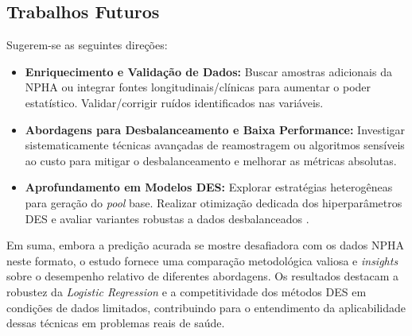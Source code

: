 \documentclass[12pt]{article}
\begin{document}
\subsection*{Trabalhos Futuros}
Sugerem-se as seguintes direções:
\begin{itemize}
    \item \textbf{Enriquecimento e Validação de Dados:} Buscar amostras adicionais da NPHA ou integrar fontes longitudinais/clínicas para aumentar o poder estatístico. Validar/corrigir ruídos identificados nas variáveis.
    \item \textbf{Abordagens para Desbalanceamento e Baixa Performance:} Investigar sistematicamente técnicas avançadas de reamostragem ou algoritmos sensíveis ao custo para mitigar o desbalanceamento e melhorar as métricas absolutas.
    \item \textbf{Aprofundamento em Modelos DES:} Explorar estratégias heterogêneas para geração do \textit{pool} base. Realizar otimização dedicada dos hiperparâmetros DES e avaliar variantes robustas a dados desbalanceados \cite{ICPRAI2018SI, Wu2021}. 
\end{itemize}

Em suma, embora a predição acurada se mostre desafiadora com os dados NPHA neste formato, o estudo fornece uma comparação metodológica valiosa e \textit{insights} sobre o desempenho relativo de diferentes abordagens. Os resultados destacam a robustez da \textit{Logistic Regression} e a competitividade dos métodos DES em condições de dados limitados, contribuindo para o entendimento da aplicabilidade dessas técnicas em problemas reais de saúde.



{}
\end{document}
